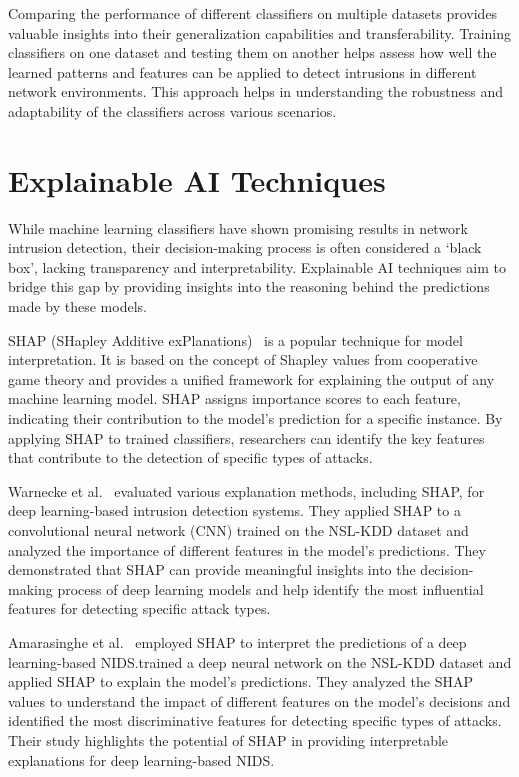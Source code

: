 Comparing the performance of different classifiers on multiple datasets provides valuable insights into their generalization capabilities and transferability. Training classifiers on one dataset and testing them on another helps assess how well the learned patterns and features can be applied to detect intrusions in different network environments. This approach helps in understanding the robustness and adaptability of the classifiers across various scenarios.

\section{Explainable AI Techniques}

While machine learning classifiers have shown promising results in network intrusion detection, their decision-making process is often considered a `black box', lacking transparency and interpretability. Explainable AI techniques aim to bridge this gap by providing insights into the reasoning behind the predictions made by these models.

SHAP (SHapley Additive exPlanations)~\cite{lundberg2017unified} is a popular technique for model interpretation. It is based on the concept of Shapley values from cooperative game theory and provides a unified framework for explaining the output of any machine learning model. SHAP assigns importance scores to each feature, indicating their contribution to the model's prediction for a specific instance. By applying SHAP to trained classifiers, researchers can identify the key features that contribute to the detection of specific types of attacks.

Warnecke et al.~\cite{warnecke2020evaluating} evaluated various explanation methods, including SHAP, for deep learning-based intrusion detection systems. They applied SHAP to a convolutional neural network (CNN) trained on the NSL-KDD dataset and analyzed the importance of different features in the model's predictions. They demonstrated that SHAP can provide meaningful insights into the decision-making process of deep learning models and help identify the most influential features for detecting specific attack types.

Amarasinghe et al.~\cite{amarasinghe2018toward} employed SHAP to interpret the predictions of a deep learning-based NIDS.\@They trained a deep neural network on the NSL-KDD dataset and applied SHAP to explain the model's predictions. They analyzed the SHAP values to understand the impact of different features on the model's decisions and identified the most discriminative features for detecting specific types of attacks. Their study highlights the potential of SHAP in providing interpretable explanations for deep learning-based NIDS.\@

